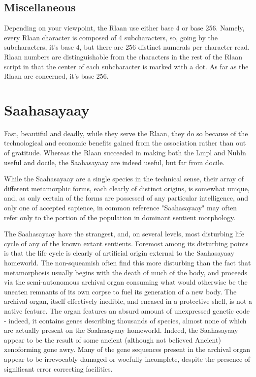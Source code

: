 \subsection{Miscellaneous}
Depending on your viewpoint, the Rlaan use either base 4 or base
256. Namely, every Rlaan character is composed of 4 subcharacters, so,
going by the subcharacters, it's base 4, but there are 256 distinct
numerals per character read. Rlaan numbers are distinguishable from
the characters in the rest of the Rlaan script in that the center of
each subcharacter is marked with a dot. As far as the Rlaan are
concerned, it's base 256.

\section{Saahasayaay}

Fast, beautiful and deadly, while they serve the Rlaan, they do so
because of the technological and economic benefits gained from the
association rather than out of gratitude. Whereas the Rlaan succeeded
in making both the Lmpl and Nuhln useful and docile, the Saahasayaay
are indeed useful, but far from docile.

While the Saahasayaay are a single species in the technical sense,
their array of different metamorphic forms, each clearly of distinct
origins, is somewhat unique, and, as only certain of the forms are
possessed of any particular intelligence, and only one of accepted
sapience, in common reference "Saahasayaay" may often refer only to
the portion of the population in dominant sentient morphology.

The Saahasayaay have the strangest, and, on several levels, most
disturbing life cycle of any of the known extant sentients. Foremost
among its disturbing points is that the life cycle is clearly of
artificial origin external to the Saahasayaay homeworld. The
non-squeamish often find this more disturbing than the fact that
metamorphosis usually begins with the death of much of the body, and
proceeds via the semi-autonomous archival organ consuming what would
otherwise be the uneaten remnants of its own corpse to fuel its
generation of a new body. The archival organ, itself effectively
inedible, and encased in a protective shell, is not a native
feature. The organ features an absurd amount of unexpressed genetic
code - indeed, it contains genes describing thousands of species,
almost none of which are actually present on the Saahasayaay
homeworld. Indeed, the Saahasayaay appear to be the result of some
ancient (although not believed Ancient) xenoforming gone awry. Many of
the gene sequences present in the archival organ appear to be
irrevocably damaged or woefully incomplete, despite the presence of
significant error correcting facilities.

